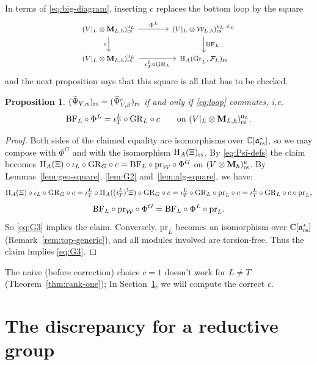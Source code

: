 \documentclass{article}
\theoremstyle{plain}
\newtheorem{proposition}[theorem]{Proposition}
\theoremstyle{definition}
\theoremstyle{remark}
\numberwithin{equation}{section}
\begin{document}
In terms of \eqref{eq:big-diagram}, inserting $c$ replaces the bottom loop by the square
\begin{equation}\label{eq:loop}
\begin{tikzcd}[column sep=3.5em,cells={nodes={font=\footnotesize}}]
(V|_L\otimes\bM_{L,\hbar})^{\fraku_L}_\rs\arrow[r,"\Phi^L"]\arrow[d,"c"']
& (V|_L\otimes\calW_{L,\hbar})^{\fraku_L,\psiL}_\rs\arrow[d,"\BF_L"]
\\
(V|_L\otimes\bM_{L,\hbar})^{\fraku_L}_\rs\arrow[r,"\iota^L_T\circ\GR_L"']
& \H_A(\GrL,\calF_L)_\rs
\end{tikzcd}
\end{equation}
and the next proposition says that this square is all that has to be checked.

\begin{proposition}\label{prop:reduction}
$(\widetilde\Psi_{V,\alpha})_{\mathrm{rs}}=(\widetilde\Psi^c_{V,\beta})_{\mathrm{rs}}$ if and only if \eqref{eq:loop} commutes, i.e.
\begin{equation}\label{eq:G3}
\mathrm{BF}_L\circ\Phi^L=\iota^L_T\circ\mathrm{GR}_L\circ c\qquad\text{on }(V|_L\otimes\mathbf{M}_{L,\hbar})^{\mathfrak{u}_L}_{\mathrm{rs}} .
\end{equation}
\end{proposition}

\begin{proof}
Both sides of the claimed equality are isomorphisms over $\mathbb{C}[\mathfrak{a}^*_{\mathrm{rs}}]$, so we may compose with $\Phi^G$ and with the isomorphism $\mathrm{H}_A(\Xi)_{\mathrm{rs}}$. By \eqref{eq:Psi-defs} the claim becomes $\mathrm{H}_A(\Xi)\circ \iota_L\circ\mathrm{GR}_G\circ c=\mathrm{BF}_L\circ\mathrm{pr}_{\mathcal{W}}\circ\Phi^G$ on $(V\otimes\mathbf{M}_\hbar)^{\mathfrak{u}}_{\mathrm{rs}}$. By Lemmas~\ref{lem:geo-square}, \ref{lem:G2} and~\ref{lem:alg-square}, we have:
\[
\mathrm{H}_A(\Xi)\circ\iota_L\circ\mathrm{GR}_G\circ c=\iota^L_T\circ\mathrm{H}_A((i^L_T)^!\Xi)\circ\mathrm{GR}_G\circ c=\iota^L_T\circ\mathrm{GR}_L\circ\mathrm{pr}_L\circ c=\iota^L_T\circ\mathrm{GR}_L\circ c\circ\mathrm{pr}_L,
\]
\[
\mathrm{BF}_L\circ\mathrm{pr}_{\mathcal{W}}\circ\Phi^G=\mathrm{BF}_L\circ\Phi^L\circ\mathrm{pr}_L .
\]
So \eqref{eq:G3} implies the claim. Conversely, $\mathrm{pr}_L$ becomes an isomorphism over $\mathbb{C}[\mathfrak{a}^*_{\mathrm{rs}}]$ (Remark~\ref{rem:top-generic}), and all modules involved are torsion-free. Thus the claim implies \eqref{eq:G3}.
\end{proof}

The naive (before correction) choice $c=1$ doesn't work for $L\neq T$ (Theorem~\ref{thm:rank-one}); In Section~\ref{sec:discrepancy}, we will compute the correct $c$.


\section{The discrepancy for a reductive group}\label{sec:discrepancy}
\end{document}
